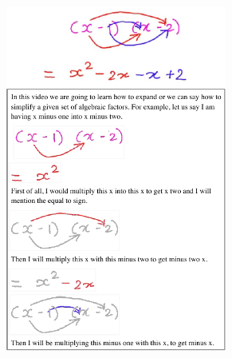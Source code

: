 \begin{figure}[h!]
    \centering
    \begin{subfigure}[t]{2.4in}
        \centering
        \includegraphics[width=0.8\textwidth]{figures/progression_ex.pdf}
    \end{subfigure}%
~
       \begin{subfigure}[t]{1.8in}
        \centering

\end{subfigure}
\end{figure}
